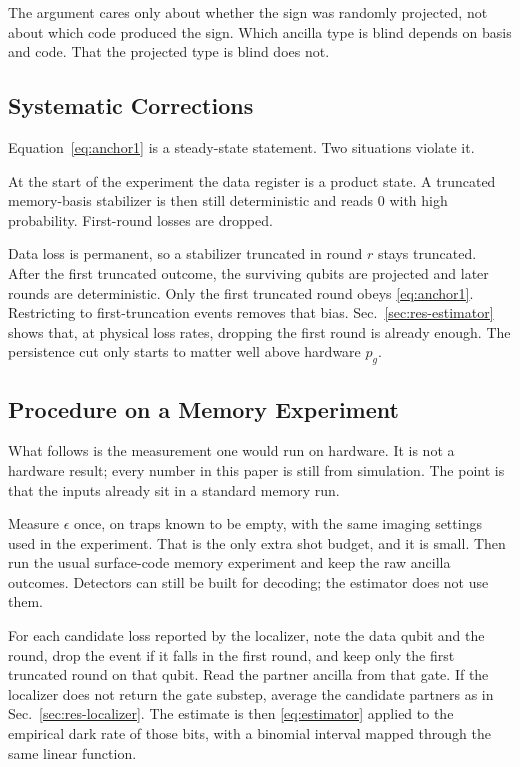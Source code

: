 \documentclass{ieeeaccess}
\begin{document}
The argument cares only about whether the sign was randomly projected, not
about which code produced the sign. Which ancilla type is blind depends on
basis and code. That the projected type is blind does not.

\subsection{Systematic Corrections}
\label{sec:theory-rules}

Equation~\eqref{eq:anchor1} is a steady-state statement. Two situations
violate it.

At the start of the experiment the data register is a product state. A
truncated memory-basis stabilizer is then still deterministic and reads $0$
with high probability. First-round losses are dropped.

Data loss is permanent, so a stabilizer truncated in round $r$ stays
truncated. After the first truncated outcome, the surviving qubits are
projected and later rounds are deterministic. Only the first truncated round
obeys \eqref{eq:anchor1}. Restricting to first-truncation events removes that
bias. Sec.~\ref{sec:res-estimator} shows that, at physical loss rates, dropping
the first round is already enough. The persistence cut only starts to matter
well above hardware $p_g$.

\subsection{Procedure on a Memory Experiment}
\label{sec:theory-protocol}

What follows is the measurement one would run on hardware. It is not a
hardware result; every number in this paper is still from simulation. The
point is that the inputs already sit in a standard memory run.

Measure $\epsilon$ once, on traps known to be empty, with the same imaging
settings used in the experiment. That is the only extra shot budget, and it
is small. Then run the usual surface-code memory experiment and keep the raw
ancilla outcomes. Detectors can still be built for decoding; the estimator
does not use them.

For each candidate loss reported by the localizer, note the data qubit and the round, drop the
event if it falls in the first round, and keep only the first truncated
round on that qubit. Read the partner ancilla from that gate. If the
localizer does not return the gate substep, average the candidate partners
as in Sec.~\ref{sec:res-localizer}. The estimate is then
\eqref{eq:estimator} applied to the empirical dark rate of those bits, with
a binomial interval mapped through the same linear function.
\end{document}
